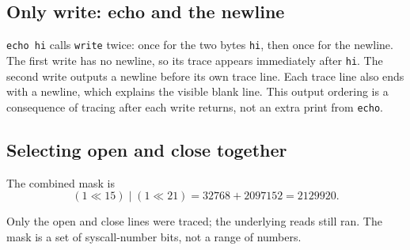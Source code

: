 \documentclass[12pt]{article}
\begin{document}
\subsection{Only write: echo and the newline}

\texttt{echo hi} calls \texttt{write} twice: once for the two bytes
\texttt{hi}, then once for the newline. The first write has no newline, so
its trace appears immediately after \texttt{hi}. The second write outputs
a newline before its own trace line. Each trace line also ends with a
newline, which explains the visible blank line. This output ordering is a
consequence of tracing after each write returns, not an extra print from
\texttt{echo}.

\subsection{Selecting open and close together}
The combined mask is
\[
(1 \ll 15)\mathbin{|}(1 \ll 21)
= 32768 + 2097152 = \boxed{2129920}.
\]

Only the open and close lines were traced; the underlying reads still ran.
The mask is a set of syscall-number bits, not a range of numbers.

\clearpage
\end{document}
